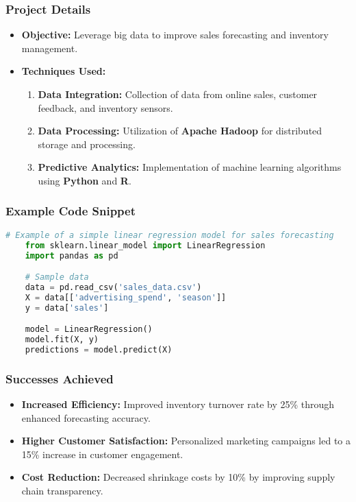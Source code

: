 \documentclass[aspectratio=169]{beamer}
\begin{document}
\begin{frame}[fragile]
    \frametitle{Project Details}

    \begin{itemize}
        \item \textbf{Objective:} Leverage big data to improve sales forecasting and inventory management.
        \item \textbf{Techniques Used:}
        \begin{enumerate}
            \item \textbf{Data Integration:} Collection of data from online sales, customer feedback, and inventory sensors.
            \item \textbf{Data Processing:} Utilization of \textbf{Apache Hadoop} for distributed storage and processing.
            \item \textbf{Predictive Analytics:} Implementation of machine learning algorithms using \textbf{Python} and \textbf{R}.
        \end{enumerate}
    \end{itemize}
\end{frame}

\begin{frame}[fragile]
    \frametitle{Example Code Snippet}

    \begin{lstlisting}[language=Python]
    # Example of a simple linear regression model for sales forecasting
    from sklearn.linear_model import LinearRegression
    import pandas as pd

    # Sample data
    data = pd.read_csv('sales_data.csv')
    X = data[['advertising_spend', 'season']]
    y = data['sales']

    model = LinearRegression()
    model.fit(X, y)
    predictions = model.predict(X)
    \end{lstlisting}
\end{frame}

\begin{frame}[fragile]
    \frametitle{Successes Achieved}

    \begin{itemize}
        \item \textbf{Increased Efficiency:} Improved inventory turnover rate by 25\% through enhanced forecasting accuracy.
        \item \textbf{Higher Customer Satisfaction:} Personalized marketing campaigns led to a 15\% increase in customer engagement.
        \item \textbf{Cost Reduction:} Decreased shrinkage costs by 10\% by improving supply chain transparency.
    \end{itemize}
\end{frame}
\end{document}
